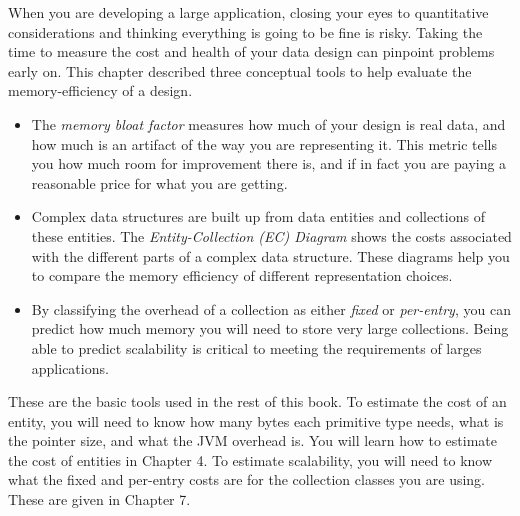 \documentclass{book}
\theoremstyle{definition}
\begin{document}
When you are developing a large application, closing your eyes to quantitative considerations and thinking everything is going to be fine is risky. Taking the time to measure the cost and health of your data design can pinpoint problems early on. This chapter described three conceptual tools to help evaluate the memory-efficiency of a design.
\begin{itemize}
\item The \textsl{memory bloat factor} measures how much of your design is real data, and how much is an artifact of the way you are representing it. This metric tells you how much room for improvement there is, and if in fact you are paying a reasonable price for what you are getting.
\item Complex data structures are built up from data entities and collections of these entities.   The \textsl{Entity-Collection (EC) Diagram} shows the costs associated with the different parts of a complex data structure. These diagrams help you to compare the memory efficiency of different representation choices.
\item By classifying the overhead of a collection as either \textsl{fixed} or \textsl{per-entry}, you can predict how much memory you will need to store very large collections. Being able to predict scalability is critical to meeting the requirements of larges applications. 
\end{itemize}
These are the basic tools used in the rest of this book. To estimate the cost of an entity, you will need to know how many bytes each primitive type needs, what is the pointer size, and what the JVM overhead is. You will learn how to estimate the cost of entities in Chapter 4. To estimate scalability, you will need to know what the fixed and per-entry costs are for the collection classes you are using. These are given in Chapter 7.

\end{document}
